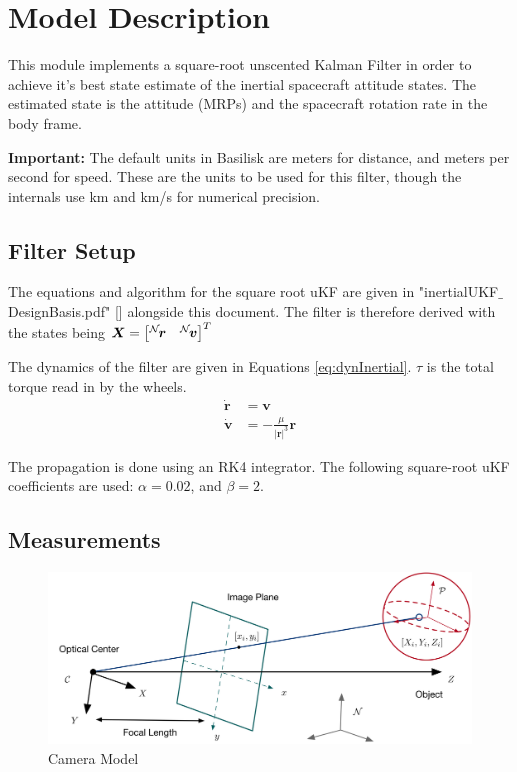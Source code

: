 
\section{Model Description}

This module implements a square-root unscented Kalman Filter in order to achieve it's best state estimate of the inertial spacecraft attitude states. The estimated state is the attitude (MRPs) and the spacecraft rotation rate in the body frame. 

\textbf{Important:} The default units in Basilisk are meters for distance, and meters per second for speed. These are the units to be used for this filter, though the internals use km and km/s for numerical precision. 

\subsection{Filter Setup} %

The equations and algorithm for the square root uKF are given in "inertialUKF$\_$DesignBasis.pdf" [] alongside this document.
The filter is therefore derived with the states being $\bm X =\begin{bmatrix} \leftexp{N}{\bm r}&  \leftexp{N}{\bm v} \end{bmatrix}^{T}$

The dynamics of the filter are given in Equations \eqref{eq:dynInertial}. $\tau$ is the total torque read in by the wheels. 
\begin{align}
\label{eq:dynInertial}
\dot{\bm r} &=\bm v \\
\dot{\bm v} & = - \frac{\mu}{|\bm r|^3} \bm r
\end{align}

The propagation is done using an RK4 integrator. 
The following square-root uKF coefficients are used: $\alpha = 0.02$, and $\beta = 2$. 


\subsection{Measurements}

\begin{figure}[H]
	\centerline{
		\includegraphics{Figures/CameraGeometry}
	}
	\caption{Camera Model}
	\label{fig:camera}
\end{figure}


